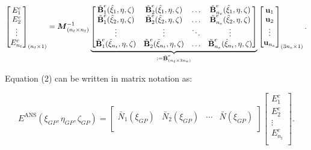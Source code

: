 \documentclass[12pt]{article}
\begin{document}
\begin{equation}
\begin{bmatrix}
E_1^c\\
E_2^c\\
\vdots \\
E_{n_t}^c\\
\end{bmatrix}_{(n_t \times 1)} = \boldsymbol{M}^{-1}_{(n_t \times n_t)}
\underbrace{\begin{bmatrix}
\tilde{\text{\bf{B}}}_1^e (\hat{\xi}_1, \eta, \zeta)  & \tilde{\text{\bf{B}}}_2^e (\hat{\xi}_1, \eta, \zeta) & \ldots & \tilde{\text{\bf{B}}}_{n_e}^e (\hat{\xi}_1, \eta, \zeta)\\
\tilde{\text{\bf{B}}}_1^e (\hat{\xi}_2, \eta, \zeta)  & \tilde{\text{\bf{B}}}_2^e (\hat{\xi}_2, \eta, \zeta) & \ldots & \tilde{\text{\bf{B}}}_{n_e}^e (\hat{\xi}_2, \eta, \zeta)\\
\vdots & \vdots & \ddots & \vdots \\
\tilde{\text{\bf{B}}}_1^e (\hat{\xi}_{n_t}, \eta, \zeta)  & \tilde{\text{\bf{B}}}_2^e (\hat{\xi}_{n_t}, \eta, \zeta) & \ldots & \tilde{\text{\bf{B}}}_{n_e}^e (\hat{\xi}_{n_t}, \eta, \zeta)\\
\end{bmatrix}}_{:= \hat{\text{\bf{B}}}^e_{(n_t \times 3n_e)}}
\begin{bmatrix}
\text{\bf{u}}_1\\
\text{\bf{u}}_2\\
\vdots \\
\text{\bf{u}}_{n_e}\\
\end{bmatrix}_{(3n_e \times 1)}.
\end{equation}

Equation (2) can be written in matrix notation as:

\begin{equation}
E^{\text{ANS}} (\xi_{GP}, \eta_{GP}, \zeta_{GP}) =
\begin{bmatrix}
\bar{N}_1(\xi_{GP}) & \bar{N}_2(\xi_{GP}) & \cdots &\bar{N}(\xi_{GP})\\
\end{bmatrix}
\begin{bmatrix}
E^c_1\\
E^c_2\\
\vdots \\
E^c_{n_t}\\
\end{bmatrix}.
\end{equation}
\end{document}
